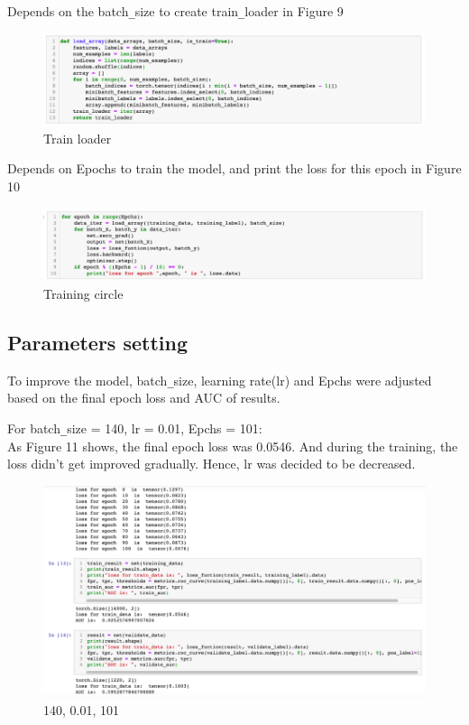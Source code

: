\documentclass{article}
\begin{document}
Depends on the batch\verb+_+size to create train\verb+_+loader in Figure 9

\begin{figure}[H]
  \centering
  \includegraphics[width=1.0\textwidth]{img/Picture 8}
  \caption{Train loader }
\end{figure}

Depends on Epochs to train the model, and print the loss for this epoch in Figure 10

\begin{figure}[H]
  \centering
  \includegraphics[width=1.0\textwidth]{img/Picture 9}
  \caption{Training circle}
\end{figure}

\subsection{Parameters setting}

To improve the model, batch\verb+_+size, learning rate(lr) and Epchs were adjusted based on the final epoch loss and AUC of results.

For batch\verb+_+size = 140, lr = 0.01, Epchs = 101:\\
As Figure 11 shows, the final epoch loss was 0.0546. And during the training, the loss didn’t get improved gradually. Hence, lr was decided to be decreased.

\begin{figure}[H]
  \centering
  \includegraphics[width=1.0\textwidth]{img/Picture 10}
  \caption{140, 0.01, 101}
\end{figure}
\end{document}
